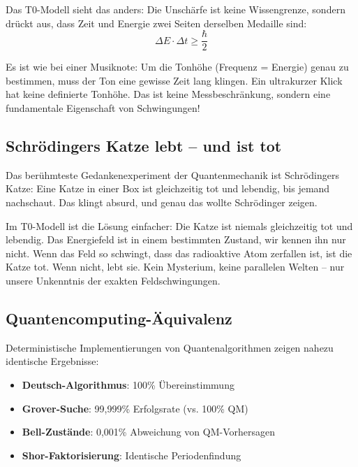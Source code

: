 \documentclass[12pt,a4paper]{article}
\begin{document}
	Das T0-Modell sieht das anders: Die Unschärfe ist keine Wissengrenze, sondern drückt aus, dass Zeit und Energie zwei Seiten derselben Medaille sind:
	\begin{equation}
		\Delta E \cdot \Delta t \geq \frac{\hbar}{2}
	\end{equation}
	
	Es ist wie bei einer Musiknote: Um die Tonhöhe (Frequenz = Energie) genau zu bestimmen, muss der Ton eine gewisse Zeit lang klingen. Ein ultrakurzer Klick hat keine definierte Tonhöhe. Das ist keine Messbeschränkung, sondern eine fundamentale Eigenschaft von Schwingungen!
	
	\subsection{Schrödingers Katze lebt -- und ist tot}
	
	Das berühmteste Gedankenexperiment der Quantenmechanik ist Schrödingers Katze: Eine Katze in einer Box ist gleichzeitig tot und lebendig, bis jemand nachschaut. Das klingt absurd, und genau das wollte Schrödinger zeigen.
	
	Im T0-Modell ist die Lösung einfacher: Die Katze ist niemals gleichzeitig tot und lebendig. Das Energiefeld ist in einem bestimmten Zustand, wir kennen ihn nur nicht. Wenn das Feld so schwingt, dass das radioaktive Atom zerfallen ist, ist die Katze tot. Wenn nicht, lebt sie. Kein Mysterium, keine parallelen Welten -- nur unsere Unkenntnis der exakten Feldschwingungen.
	
	\subsection{Quantencomputing-Äquivalenz}
	
	\begin{experimental}
		Deterministische Implementierungen von Quantenalgorithmen zeigen nahezu identische Ergebnisse:
		\begin{itemize}
			\item \textbf{Deutsch-Algorithmus}: 100\% Übereinstimmung
			\item \textbf{Grover-Suche}: 99,999\% Erfolgsrate (vs. 100\% QM)
			\item \textbf{Bell-Zustände}: 0,001\% Abweichung von QM-Vorhersagen
			\item \textbf{Shor-Faktorisierung}: Identische Periodenfindung
		\end{itemize}
	\end{experimental}
	
\end{document}
